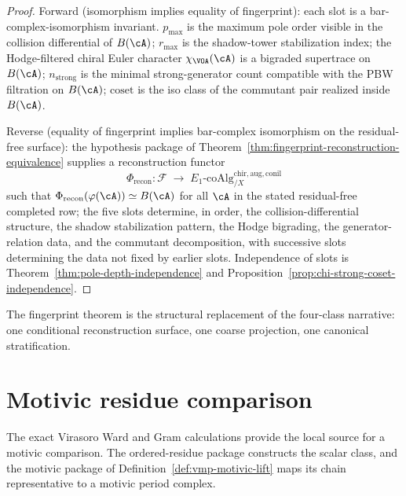 \begin{proof}
Forward \textup{(}isomorphism implies equality of fingerprint\textup{)}:
each slot is a bar-complex-isomorphism invariant. $p_{\max}$ is
the maximum pole order visible in the collision differential of
$B(\cA)$; $r_{\max}$ is the shadow-tower stabilization index; the
Hodge-filtered chiral Euler character $\chi_{\VOA}(\cA)$ is a
bigraded supertrace on $B(\cA)$; $n_{\mathrm{strong}}$ is the
minimal strong-generator count compatible with the PBW
filtration on $B(\cA)$; $\mathrm{coset}$ is the iso class of the
commutant pair realized inside $B(\cA)$.

Reverse \textup{(}equality of fingerprint implies bar-complex
isomorphism on the residual-free surface\textup{)}:
the hypothesis package of
Theorem~\ref{thm:fingerprint-reconstruction-equivalence} supplies a
reconstruction functor
\begin{equation}
 \Phi_{\mathrm{recon}}\colon \mathcal{F}
 \;\longrightarrow\; E_1\text{-coAlg}^{\mathrm{chir},
 \mathrm{aug}, \mathrm{conil}}_{/X}
\end{equation}
such that $\Phi_{\mathrm{recon}}(\varphi(\cA)) \simeq B(\cA)$ for
all $\cA$ in the stated residual-free completed row; the five slots determine,
in order, the collision-differential structure, the shadow
stabilization pattern, the Hodge bigrading, the generator-relation
data, and the commutant decomposition, with successive slots
determining the data not fixed by earlier slots. Independence
of slots is
Theorem~\ref{thm:pole-depth-independence} and
Proposition~\ref{prop:chi-strong-coset-independence}.
\end{proof}

The fingerprint theorem is the structural replacement of the
four-class narrative: one conditional reconstruction surface, one
coarse projection, one canonical stratification.

\section{Motivic residue comparison}
\label{sec:part-ii-motivic}

The exact Virasoro Ward and Gram calculations provide the local
source for a motivic comparison.  The ordered-residue package
constructs the scalar class, and the motivic package of
Definition~\ref{def:vmp-motivic-lift} maps its chain representative
to a motivic period complex.

